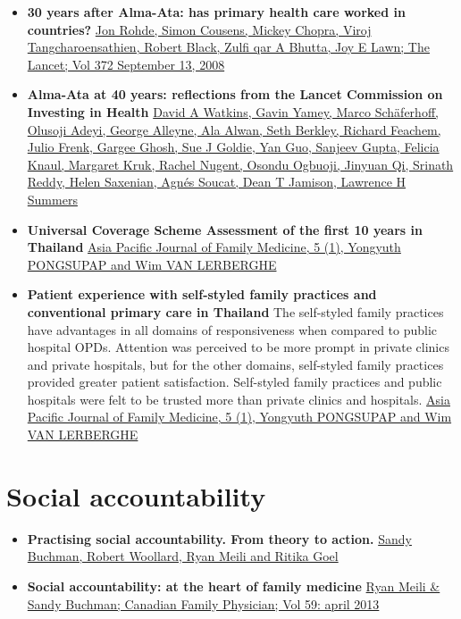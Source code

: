 \documentclass[]{book}
\begin{document}
\begin{itemize}
\item
  \textbf{30 years after Alma-Ata: has primary health care worked in countries?} \href{https://sci-hub.se/https://doi.org/10.1016/S0140-6736(08)61405-1}{Jon Rohde, Simon Cousens, Mickey Chopra, Viroj Tangcharoensathien, Robert Black, Zulfi qar A Bhutta, Joy E Lawn; The Lancet; Vol 372 September 13, 2008}
\item
  \textbf{Alma-Ata at 40 years: reflections from the Lancet Commission on Investing in Health} \href{https://sci-hub.se/https://doi.org/10.1016/S0140-6736(18)32389-4}{David A Watkins, Gavin Yamey, Marco Schäferhoff, Olusoji Adeyi, George Alleyne, Ala Alwan, Seth Berkley, Richard Feachem, Julio Frenk, Gargee Ghosh, Sue J Goldie, Yan Guo, Sanjeev Gupta, Felicia Knaul, Margaret Kruk, Rachel Nugent, Osondu Ogbuoji, Jinyuan Qi, Srinath Reddy, Helen Saxenian, Agnés Soucat, Dean T Jamison, Lawrence H Summers}
\item
  \textbf{Universal Coverage Scheme Assessment of the first 10 years in Thailand} \href{https://www.hsri.or.th/sites/default/files/browse/tor5-1-1.pdf}{Asia Pacific Journal of Family Medicine, 5 (1), Yongyuth PONGSUPAP and Wim VAN LERBERGHE}
\item
  \textbf{Patient experience with self-styled family practices and conventional primary care in Thailand} The self-styled family practices have advantages in all domains of responsiveness when compared to public hospital OPDs. Attention was perceived to be more prompt in private clinics and private hospitals, but for the other domains, self-styled family practices provided greater patient satisfaction. Self-styled family practices and public hospitals were felt to be trusted more than private clinics and hospitals. \href{http://www.apfmj-archive.com/afm5_1/afm27.pdf}{Asia Pacific Journal of Family Medicine, 5 (1), Yongyuth PONGSUPAP and Wim VAN LERBERGHE}
\end{itemize}

\hypertarget{social-accountability}{%
\section*{Social accountability}\label{social-accountability}}

\begin{itemize}
\item
  \textbf{Practising social accountability. From theory to action.} \href{https://www.ncbi.nlm.nih.gov/pmc/articles/PMC4721832/pdf/0620015.pdf}{Sandy Buchman, Robert Woollard, Ryan Meili and Ritika Goel}
\item
  \textbf{Social accountability: at the heart of family medicine} \href{https://www.ncbi.nlm.nih.gov/pmc/articles/PMC3625068/pdf/0590335.pdf}{Ryan Meili \& Sandy Buchman; Canadian Family Physician; Vol 59: april 2013}
\end{itemize}
\end{document}
